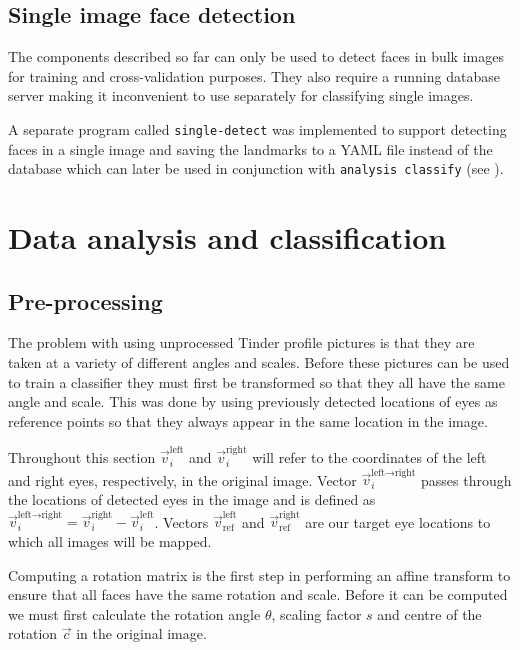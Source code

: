 \subsection{Single image face detection}
The components described so far can only be used to detect faces in bulk images
for training and cross-validation purposes. They also require a running
database server making it inconvenient to use separately for classifying single
images.

A separate program called \texttt{single-detect} was implemented to support
detecting faces in a single image and saving the landmarks to a YAML file
instead of the database which can later be used in conjunction with
\texttt{analysis classify} (see ).

\section{Data analysis and classification}
\label{spec:analysis}
\subsection{Pre-processing}
\label{spec:analysis:preproc}
\newcommand{\vleftright}{\vec{v}_i^{\text{left} \rightarrow \text{right}}}
\newcommand{\vi}[1]{\vec{v}_i^{\text{#1}}}
\newcommand{\vr}[1]{\vec{v}_{\text{ref}}^{\text{#1}}}
\newcommand{\vref}{\vec{v}_{\text{ref}}^{\text{left} \rightarrow \text{right}}}
The problem with using unprocessed Tinder profile pictures is that they are 
taken at a variety of different angles and scales. Before these pictures can 
be used to train a classifier they must first be transformed so that they all 
have the same angle and scale. This was done by using previously detected 
locations of eyes as reference points so that they always appear in the same 
location in the image. 

Throughout this section $\vi{left}$ and $\vi{right}$ will refer to the
coordinates of the left and right eyes, respectively, in the original image.
Vector $\vleftright$ passes through the locations of detected eyes in the image
and is defined as $\vleftright = \vi{right} - \vi{left}$. Vectors
$\vr{left}$ and $\vr{right}$ are our target eye locations to which all images
will be mapped.

Computing a rotation matrix is the first step in performing an affine transform
to ensure that all faces have the same rotation and scale. Before it can be 
computed we must first calculate the rotation angle $\theta$, scaling factor
$s$ and centre of the rotation $\vec{c}$ in the original image.

